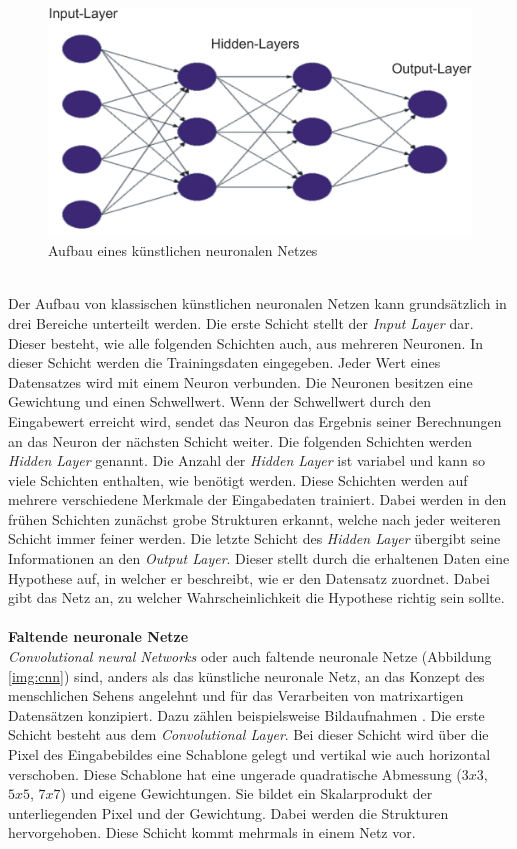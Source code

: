 \begin{figure}
	[h]
	\centering
	\includegraphics[scale=0.5]{Sources/nnet.png}
	\caption{Aufbau eines künstlichen neuronalen Netzes \cite{bistra2018pic}}
	\label{img:neuronales_netz}
\end{figure}\\
Der Aufbau von klassischen künstlichen neuronalen Netzen kann grundsätzlich in drei Bereiche unterteilt werden. Die erste Schicht stellt der \textit{Input Layer} dar. Dieser besteht, wie alle folgenden Schichten auch, aus mehreren Neuronen. In dieser Schicht werden die Trainingsdaten eingegeben. Jeder Wert eines Datensatzes wird mit einem Neuron verbunden. Die Neuronen besitzen eine Gewichtung und einen Schwellwert. Wenn der Schwellwert durch den Eingabewert erreicht wird, sendet das Neuron das Ergebnis seiner Berechnungen an das Neuron der nächsten Schicht weiter. Die folgenden Schichten werden \textit{Hidden Layer} genannt. Die Anzahl der \textit{Hidden Layer} ist variabel und kann so viele Schichten enthalten, wie benötigt werden. Diese Schichten werden auf mehrere verschiedene Merkmale der Eingabedaten trainiert. Dabei werden in den frühen Schichten zunächst grobe Strukturen erkannt, welche nach jeder weiteren Schicht immer feiner werden. Die letzte Schicht des \textit{Hidden Layer} übergibt seine Informationen an den \textit{Output Layer}. Dieser stellt durch die erhaltenen Daten eine Hypothese auf, in welcher er beschreibt, wie er den Datensatz zuordnet. Dabei gibt das Netz an, zu welcher Wahrscheinlichkeit die Hypothese richtig sein sollte.\\\\
\textbf{Faltende neuronale Netze}\label{s.cnn}\\
\textit{Convolutional neural Networks} oder auch faltende neuronale Netze (Abbildung \ref{img:cnn}) sind, anders als das künstliche neuronale Netz, an das Konzept des menschlichen Sehens angelehnt \cite{sermanet2012convolutional} und für das Verarbeiten von matrixartigen Datensätzen konzipiert. Dazu zählen beispielsweise Bildaufnahmen \cite{goodfellow2016deep}. Die erste Schicht besteht aus dem \textit{Convolutional Layer}. Bei dieser Schicht wird über die Pixel des Eingabebildes eine Schablone gelegt und vertikal wie auch horizontal verschoben. Diese Schablone hat eine ungerade quadratische Abmessung ($3x3$, $5x5$, $7x7$) und eigene Gewichtungen. Sie bildet ein Skalarprodukt der unterliegenden Pixel und der Gewichtung. Dabei werden die Strukturen hervorgehoben. Diese Schicht kommt mehrmals in einem Netz vor.\\  
